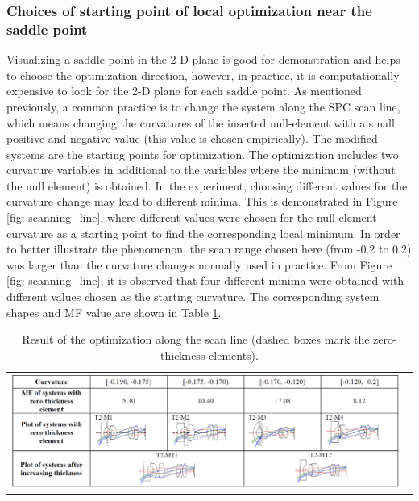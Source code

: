 \subsubsection{Choices of starting point of local optimization near the saddle point}
Visualizing a saddle point in the 2-D plane is good for demonstration and helps to choose the optimization direction, however, in practice, it is computationally expensive to look for the 2-D plane for each saddle point. As mentioned previously, a common practice is to change the system along the SPC scan line, which means changing the curvatures of the inserted null-element with a small positive and negative value (this value is chosen empirically). The modified systems are the starting points for optimization. The optimization includes two curvature variables in additional to the variables where the minimum (without the null element) is obtained. In the experiment, choosing different values for the curvature change may lead to different minima. This is demonstrated in Figure \ref{fig: scanning_line}, where different values were chosen for the null-element curvature as a starting point to find  the corresponding local minimum. In order to better illustrate the phenomenon, the scan range chosen here (from -0.2 to 0.2) was larger than the curvature changes normally used in practice. From Figure \ref{fig: scanning_line}, it is observed that four different minima were obtained with different values chosen as the starting curvature. The corresponding system shapes and MF value are shown in Table \ref{table: scanline}. 
\begin{table}[h!]
    \centering
    \captionsetup{justification=centering}
    \caption{Result of the optimization along the scan line (dashed boxes mark the zero-thickness elements).}
    \label{table: scanline}
    \vspace{-1em}
    \hspace*{-16.5pt} %
    \begin{tabular}{l}
    \includegraphics[width=0.98\textwidth]{chapter-4/figures/Line_Opt_table.png}
    \end{tabular}
\end{table}
